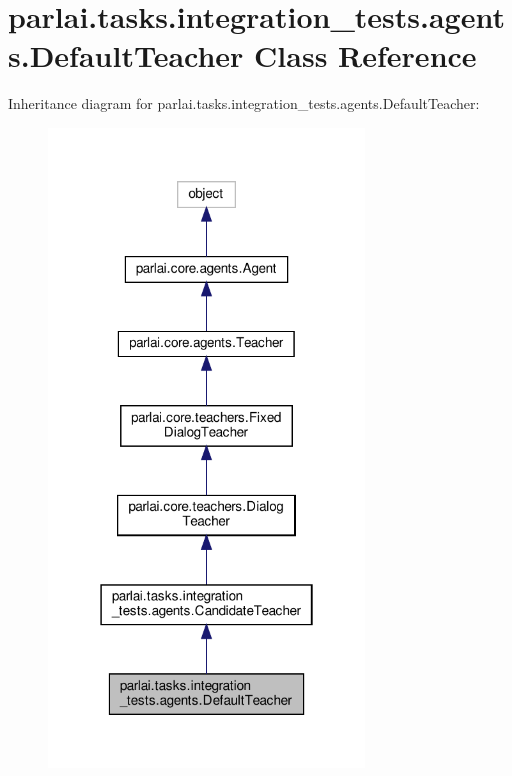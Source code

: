 \hypertarget{classparlai_1_1tasks_1_1integration__tests_1_1agents_1_1DefaultTeacher}{}\section{parlai.\+tasks.\+integration\+\_\+tests.\+agents.\+Default\+Teacher Class Reference}
\label{classparlai_1_1tasks_1_1integration__tests_1_1agents_1_1DefaultTeacher}


Inheritance diagram for parlai.\+tasks.\+integration\+\_\+tests.\+agents.\+Default\+Teacher\+:
\nopagebreak
\begin{figure}[H]
\begin{center}
\leavevmode
\includegraphics[width=238pt]{classparlai_1_1tasks_1_1integration__tests_1_1agents_1_1DefaultTeacher__inherit__graph}
\end{center}
\end{figure}


